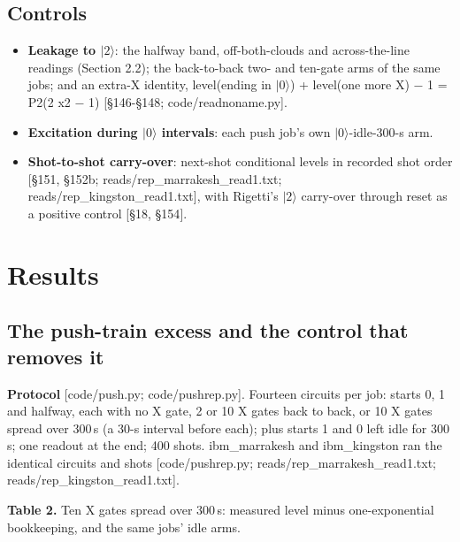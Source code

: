 \documentclass[11pt]{article}
\begin{document}
\subsection{Controls}
\begin{itemize}
\item \textbf{Leakage to \(|2\rangle\)}: the halfway band, off-both-clouds and across-the-line readings (Section 2.2); the back-to-back two- and ten-gate arms of the same jobs; and an extra-X identity, level(ending in \(|0\rangle\)) + level(one more X) \(-\) 1 = P2(2 x2 \(-\) 1) {[}\S{}146-\S{}148; code/readnoname.py{]}.
\item \textbf{Excitation during \(|0\rangle\) intervals}: each push job's own \(|0\rangle\)-idle-300-\textmu s arm.
\item \textbf{Shot-to-shot carry-over}: next-shot conditional levels in recorded shot order {[}\S{}151, \S{}152b; reads/rep\_marrakesh\_read1.txt; reads/rep\_kingston\_read1.txt{]}, with Rigetti's \(|2\rangle\) carry-over through reset as a positive control {[}\S{}18, \S{}154{]}.
\end{itemize}
\section{Results}
\subsection{The push-train excess and the control that removes it}
\textbf{Protocol} {[}code/push.py; code/pushrep.py{]}. Fourteen circuits per job: starts 0, 1 and halfway, each with no X gate, 2 or 10 X gates back to back, or 10 X gates spread over 300\,\textmu s (a 30-\textmu s interval before each); plus starts 1 and 0 left idle for 300\,\textmu s; one readout at the end; 400 shots. ibm\_marrakesh and ibm\_kingston ran the identical circuits and shots {[}code/pushrep.py; reads/rep\_marrakesh\_read1.txt; reads/rep\_kingston\_read1.txt{]}.

\textbf{Table 2.} Ten X gates spread over 300\,\textmu s: measured level minus one-exponential bookkeeping, and the same jobs' idle arms.
\end{document}
